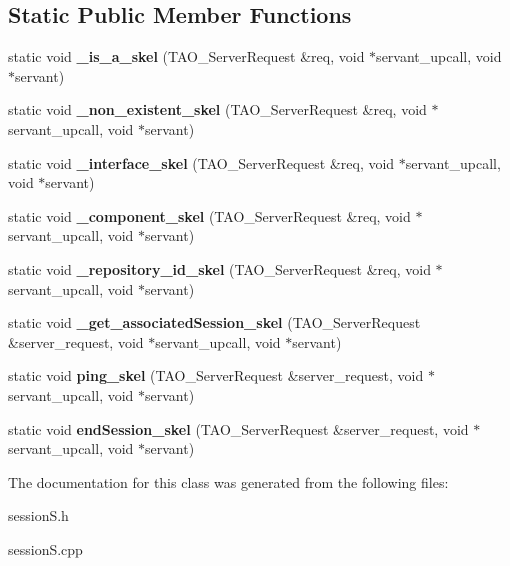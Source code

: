 \subsection*{Static Public Member Functions}
\begin{DoxyCompactItemize}
\item 
static void {\bfseries \+\_\+is\+\_\+a\+\_\+skel} (T\+A\+O\+\_\+\+Server\+Request \&req, void $\ast$servant\+\_\+upcall, void $\ast$servant)\label{classPOA__session_1_1Session__I_ad0d293dd35937925b7219d73c81b1931}

\item 
static void {\bfseries \+\_\+non\+\_\+existent\+\_\+skel} (T\+A\+O\+\_\+\+Server\+Request \&req, void $\ast$servant\+\_\+upcall, void $\ast$servant)\label{classPOA__session_1_1Session__I_a332c52d44dd9eef7f0fb7be606466094}

\item 
static void {\bfseries \+\_\+interface\+\_\+skel} (T\+A\+O\+\_\+\+Server\+Request \&req, void $\ast$servant\+\_\+upcall, void $\ast$servant)\label{classPOA__session_1_1Session__I_a6eaf0d6a842740f8b9c1ee1cfbf9eb9e}

\item 
static void {\bfseries \+\_\+component\+\_\+skel} (T\+A\+O\+\_\+\+Server\+Request \&req, void $\ast$servant\+\_\+upcall, void $\ast$servant)\label{classPOA__session_1_1Session__I_adfda23da877024a60b4a1e8c57a3b9f5}

\item 
static void {\bfseries \+\_\+repository\+\_\+id\+\_\+skel} (T\+A\+O\+\_\+\+Server\+Request \&req, void $\ast$servant\+\_\+upcall, void $\ast$servant)\label{classPOA__session_1_1Session__I_af5044cf59539bc1390f609a076ff3c86}

\item 
static void {\bfseries \+\_\+get\+\_\+associated\+Session\+\_\+skel} (T\+A\+O\+\_\+\+Server\+Request \&server\+\_\+request, void $\ast$servant\+\_\+upcall, void $\ast$servant)\label{classPOA__session_1_1Session__I_a8db1437b87d760245c45e1a42f30958f}

\item 
static void {\bfseries ping\+\_\+skel} (T\+A\+O\+\_\+\+Server\+Request \&server\+\_\+request, void $\ast$servant\+\_\+upcall, void $\ast$servant)\label{classPOA__session_1_1Session__I_ac7b3559bc48d8b73a6d851242639afb2}

\item 
static void {\bfseries end\+Session\+\_\+skel} (T\+A\+O\+\_\+\+Server\+Request \&server\+\_\+request, void $\ast$servant\+\_\+upcall, void $\ast$servant)\label{classPOA__session_1_1Session__I_a3c63fdb7c1a8d482089547358254062c}

\end{DoxyCompactItemize}


The documentation for this class was generated from the following files\+:\begin{DoxyCompactItemize}
\item 
session\+S.\+h\item 
session\+S.\+cpp\end{DoxyCompactItemize}
